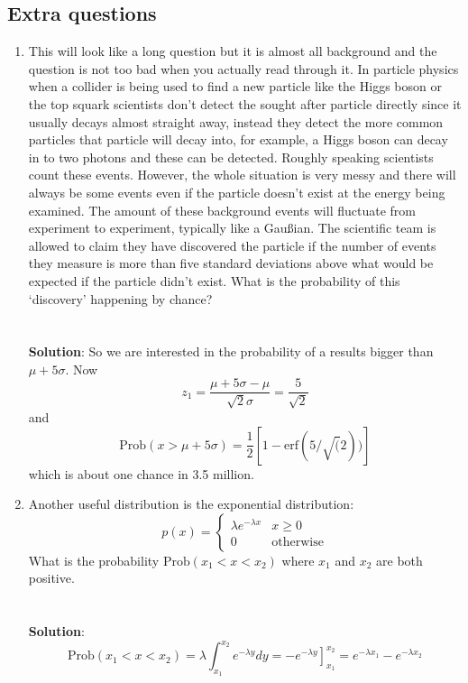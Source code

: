 \documentclass[11pt,a4paper]{scrartcl}
\begin{document}
\subsection*{Extra questions}

\begin{enumerate}

  
\item This will look like a long question but it is almost all
  background and the question is not too bad when you actually read
  through it. In particle physics when a collider is being used to
  find a new particle like the Higgs boson or the top squark
  scientists don't detect the sought after particle directly since it
  usually decays almost straight away, instead they detect the more
  common particles that particle will decay into, for example, a Higgs
  boson can decay in to two photons and these can be detected. Roughly
  speaking scientists count these events. However, the whole situation
  is very messy and there will always be some events even if the
  particle doesn't exist at the energy being examined. The amount of
  these background events will fluctuate from experiment to
  experiment, typically like a Gau\ss{}ian. The scientific team is
  allowed to claim they have discovered the particle if the number of
  events they measure is more than five standard deviations above
  what would be expected if the particle didn't exist. What is the
  probability of this \lq{}discovery\rq{} happening by chance?
  \\ \\ \\ \textbf{Solution}: So we are interested in the probability of a results bigger than $\mu+5\sigma$. Now
\begin{equation}
z_1=\frac{\mu+5\sigma-\mu}{\sqrt{2}\sigma}=\frac{5}{\sqrt{2}}
\end{equation}
and
\begin{equation}
\mbox{Prob}(x>\mu+5\sigma)=\frac{1}{2}[1-\mbox{erf}(5/\sqrt(2))]
\end{equation}
which is about one chance in 3.5 million.

\item Another useful distribution is the exponential distribution:
$$
p(x)=\left\{\begin{array}{cc}\lambda e^{-\lambda x}& x\ge 0\\ 0&\mbox{otherwise}\end{array}\right.
$$
What is the probability $\mbox{Prob}(x_1 < x <x_2)$ where $x_1$ and $x_2$ are both positive.
  \\ \\ \\ \textbf{Solution}: 
\begin{equation}
\mbox{Prob}(x_1 < x <x_2)=\lambda \int_{x_1}^{x_2} e^{-\lambda y}dy=-\left. e^{-\lambda y} \right]_{x_1}^{x_2}=e^{-\lambda x_1}-e^{-\lambda x_2}
\end{equation}


\end{enumerate}
\end{document}
